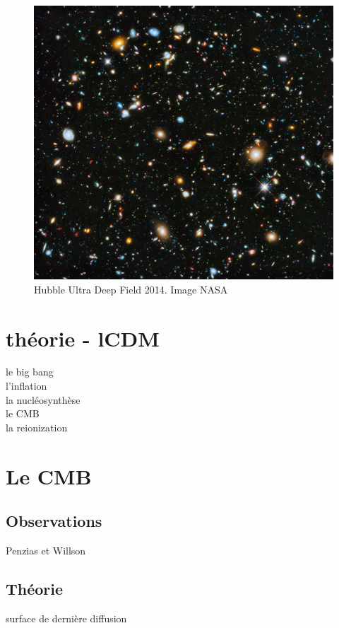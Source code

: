\begin{figure}[bth]
        \includegraphics[width=.9\linewidth]{img/01/hudf.jpeg} 
        \caption{Hubble Ultra Deep Field 2014. 
        Image NASA}
 		\label{fig:hubbl_deep_field}
\end{figure}

\section{théorie - lCDM}

le big bang\\
l'inflation\\
la nucléosynthèse\\
le CMB\\
la reionization


\section{Le CMB}


\subsection{Observations}

Penzias et Willson

\subsection{Théorie}

surface de dernière diffusion


